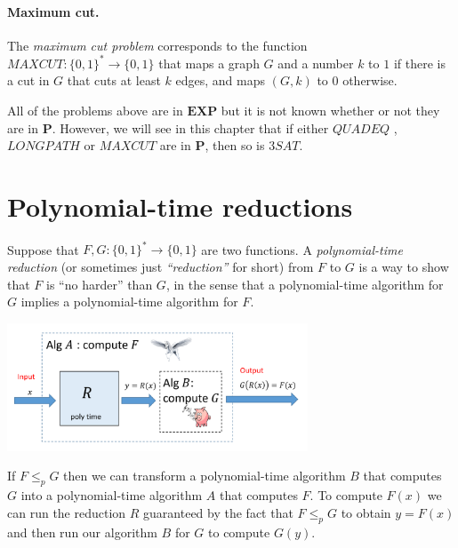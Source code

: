 \paragraph{Maximum cut.} The \emph{maximum cut problem} corresponds to
the function
\(\ensuremath{\mathit{MAXCUT}}:\{0,1\}^* \rightarrow \{0,1\}\) that maps
a graph \(G\) and a number \(k\) to \(1\) if there is a cut in \(G\)
that cuts at least \(k\) edges, and maps \((G,k)\) to \(0\) otherwise.

All of the problems above are in \(\mathbf{EXP}\) but it is not known
whether or not they are in \(\mathbf{P}\). However, we will see in this
chapter that if either \(\ensuremath{\mathit{QUADEQ}}\) ,
\(\ensuremath{\mathit{LONGPATH}}\) or \(\ensuremath{\mathit{MAXCUT}}\)
are in \(\mathbf{P}\), then so is \(3\ensuremath{\mathit{SAT}}\).

\section{Polynomial-time reductions}\label{polytimeredsec}

Suppose that \(F,G:\{0,1\}^* \rightarrow \{0,1\}\) are two functions. A
\emph{polynomial-time reduction} (or sometimes just \emph{``reduction''}
for short) from \(F\) to \(G\) is a way to show that \(F\) is ``no
harder'' than \(G\), in the sense that a polynomial-time algorithm for
\(G\) implies a polynomial-time algorithm for \(F\).

\hypertarget{reduction-def}{}


\begin{marginfigure}
\centering
\includegraphics[width=\linewidth, height=1.5in, keepaspectratio]{../figure/reductiondescription.png}
\caption{If \(F \leq_p G\) then we can transform a polynomial-time
algorithm \(B\) that computes \(G\) into a polynomial-time algorithm
\(A\) that computes \(F\). To compute \(F(x)\) we can run the reduction
\(R\) guaranteed by the fact that \(F \leq_p G\) to obtain \(y=F(x)\)
and then run our algorithm \(B\) for \(G\) to compute \(G(y)\).}
\label{reductionsfig}
\end{marginfigure}

